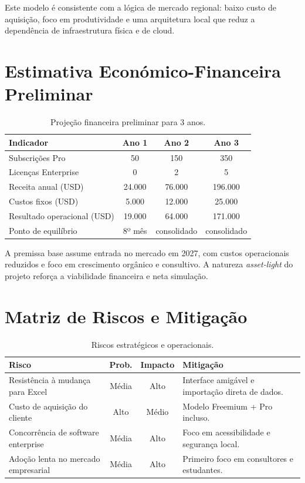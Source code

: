 \documentclass[11pt,a4paper]{article}
\begin{document}
Este modelo é consistente com a lógica de mercado regional: baixo custo de aquisição, foco em produtividade e uma arquitetura local que reduz a dependência de infraestrutura física e de cloud.

\section{Estimativa Económico-Financeira Preliminar}
\begin{table}[H]
\centering
\renewcommand{\arraystretch}{1.3}
\begin{tabularx}{\textwidth}{X|ccc}
\toprule
\textbf{Indicador} & \textbf{Ano 1} & \textbf{Ano 2} & \textbf{Ano 3} \\
\midrule
Subscrições Pro & 50 & 150 & 350 \\
Licenças Enterprise & 0 & 2 & 5 \\
Receita anual (USD) & 24.000 & 76.000 & 196.000 \\
Custos fixos (USD) & 5.000 & 12.000 & 25.000 \\
Resultado operacional (USD) & 19.000 & 64.000 & 171.000 \\
Ponto de equilíbrio & 8º mês & consolidado & consolidado \\
\bottomrule
\end{tabularx}
\caption{Projeção financeira preliminar para 3 anos.}
\end{table}

A premissa base assume entrada no mercado em 2027, com custos operacionais reduzidos e foco em crescimento orgânico e consultivo. A natureza \textit{asset-light} do projeto reforça a viabilidade financeira e neta simulação.

\section{Matriz de Riscos e Mitigação}
\begin{table}[H]
\centering
\renewcommand{\arraystretch}{1.2}
\begin{tabularx}{\textwidth}{>{\raggedright\arraybackslash}X|c|c|>{\raggedright\arraybackslash}X}
\toprule
\textbf{Risco} & \textbf{Prob.} & \textbf{Impacto} & \textbf{Mitigação} \\
\midrule
Resistência à mudança para Excel & Média & Alto & Interface amigável e importação direta de dados. \\
Custo de aquisição do cliente & Alto & Médio & Modelo Freemium + Pro incluso. \\
Concorrência de software enterprise & Média & Alto & Foco em acessibilidade e segurança local. \\
Adoção lenta no mercado empresarial & Média & Alto & Primeiro foco em consultores e estudantes. \\
\bottomrule
\end{tabularx}
\caption{Riscos estratégicos e operacionais.}
\end{table}
\end{document}
